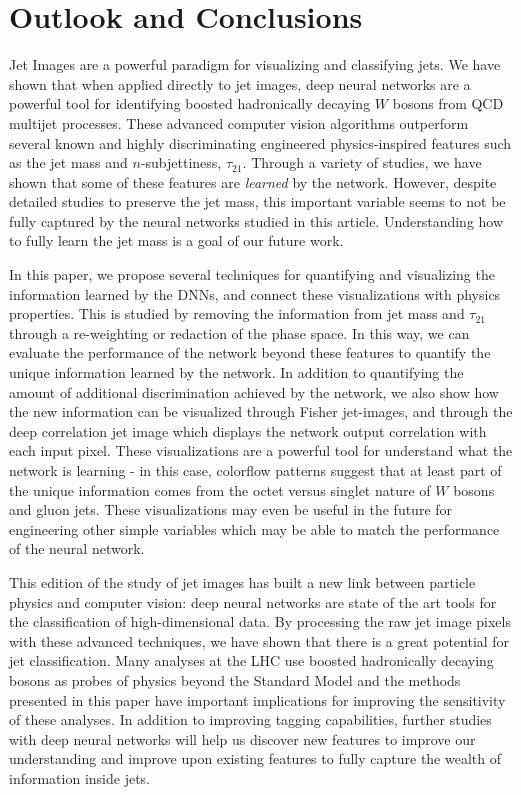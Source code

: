 \section{Outlook and Conclusions}
\label{sec:conclusion}
Jet Images are a powerful paradigm for visualizing and classifying jets.  We have shown that when applied directly to jet images, deep neural networks are a powerful tool for identifying boosted hadronically decaying $W$ bosons from QCD multijet processes.  These advanced computer vision algorithms outperform several known and highly discriminating engineered physics-inspired features such as the jet mass and $n$-subjettiness, $\tau_{21}$.  Through a variety of studies, we have shown that some of these features are {\it learned} by the network.  However, despite detailed studies to preserve the jet mass, this important variable seems to not be fully captured by the neural networks studied in this article.  Understanding how to fully learn the jet mass is a goal of our future work.

In this paper, we propose several techniques for quantifying and visualizing the information learned by the DNNs, and connect these visualizations with physics properties.  This is studied by removing the information from jet mass and $\tau_{21}$ through a re-weighting or redaction of the phase space.  In this way, we can evaluate the performance of the network beyond these features to quantify the unique information learned by the network.  In addition to quantifying the amount of additional discrimination achieved by the network, we also show how the new information can be visualized through Fisher jet-images, and through the deep correlation jet image which displays the network output correlation with each input pixel.  These visualizations are a powerful tool for understand what the network is learning - in this case, colorflow patterns suggest that at least part of the unique information comes from the octet versus singlet nature of $W$ bosons and gluon jets.  These visualizations may even be useful in the future for engineering other simple variables which may be able to match the performance of the neural network.  

This edition of the study of jet images has built a new link between particle physics and computer vision: deep neural networks are state of the art tools for the classification of high-dimensional data.  By processing the raw jet image pixels with these advanced techniques, we have shown that there is a great potential for jet classification.  Many analyses at the LHC use boosted hadronically decaying bosons as probes of physics beyond the Standard Model and the methods presented in this paper have important implications for improving the sensitivity of these analyses.  In addition to improving tagging capabilities, further studies with deep neural networks will help us discover new features to improve our understanding and improve upon existing features to fully capture the wealth of information inside jets.